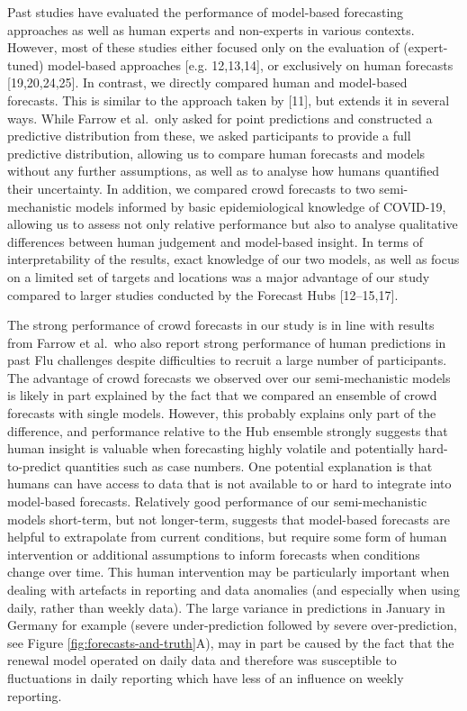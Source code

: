 \documentclass[10pt,letterpaper]{article}
\begin{document}
Past studies have evaluated the performance of model-based forecasting
approaches as well as human experts and non-experts in various contexts.
However, most of these studies either focused only on the evaluation of
(expert-tuned) model-based approaches {[}e.g. 12,13,14{]}, or
exclusively on human forecasts {[}19,20,24,25{]}. In contrast, we
directly compared human and model-based forecasts. This is similar to
the approach taken by {[}11{]}, but extends it in several ways. While
Farrow et al.~only asked for point predictions and constructed a
predictive distribution from these, we asked participants to provide a
full predictive distribution, allowing us to compare human forecasts and
models without any further assumptions, as well as to analyse how humans
quantified their uncertainty. In addition, we compared crowd forecasts
to two semi-mechanistic models informed by basic epidemiological
knowledge of COVID-19, allowing us to assess not only relative
performance but also to analyse qualitative differences between human
judgement and model-based insight. In terms of interpretability of the
results, exact knowledge of our two models, as well as focus on a
limited set of targets and locations was a major advantage of our study
compared to larger studies conducted by the Forecast Hubs
{[}12--15,17{]}.

The strong performance of crowd forecasts in our study is in line with
results from Farrow et al.~who also report strong performance of human
predictions in past Flu challenges despite difficulties to recruit a
large number of participants. The advantage of crowd forecasts we
observed over our semi-mechanistic models is likely in part explained by
the fact that we compared an ensemble of crowd forecasts with single
models. However, this probably explains only part of the difference, and
performance relative to the Hub ensemble strongly suggests that human
insight is valuable when forecasting highly volatile and potentially
hard-to-predict quantities such as case numbers. One potential
explanation is that humans can have access to data that is not available
to or hard to integrate into model-based forecasts. Relatively good
performance of our semi-mechanistic models short-term, but not
longer-term, suggests that model-based forecasts are helpful to
extrapolate from current conditions, but require some form of human
intervention or additional assumptions to inform forecasts when
conditions change over time. This human intervention may be particularly
important when dealing with artefacts in reporting and data anomalies
(and especially when using daily, rather than weekly data). The large
variance in predictions in January in Germany for example (severe
under-prediction followed by severe over-prediction, see Figure
\ref{fig:forecasts-and-truth}A), may in part be caused by the fact that
the renewal model operated on daily data and therefore was susceptible
to fluctuations in daily reporting which have less of an influence on
weekly reporting.
\end{document}
